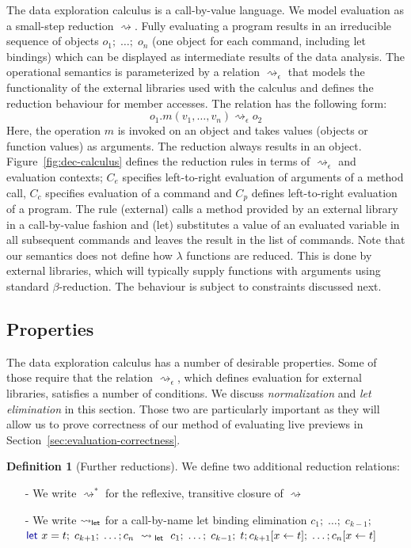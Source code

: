 \documentclass[english,submission]{programming}
\newcounter{dfc}
\theoremstyle{plain}
\theoremstyle{definition}
\newtheorem{definition}[dfc]{Definition}
\newcommand{\ident}[1]{\textnormal{\textcolor{idclr}{\sffamily #1}}}
\newcommand{\kvd}[1]{\textnormal{\textcolor{kvdclr}{\sffamily #1}}}
\newcommand{\rname}[1]{{\sffamily(#1)}}
\begin{document}
The data exploration calculus is a call-by-value language. We model evaluation as a small-step
reduction $\rightsquigarrow$. Fully evaluating a program results in an irreducible sequence of
objects $o_1;\; \ldots;\; o_n$ (one object for each command, including let bindings) which can be
displayed as intermediate results of the data analysis. The operational semantics is parameterized
by a relation $\rightsquigarrow_\epsilon$ that models the functionality of the external libraries
used with the calculus and defines the reduction behaviour for member accesses. The relation has the
following form:
%
\begin{equation*}
o_1.m(v_1, \ldots, v_n) \rightsquigarrow_\epsilon o_2
\end{equation*}
%
Here, the operation $m$ is invoked on an object and takes values (objects or function values) as arguments.
The reduction always results in an object.
Figure~\ref{fig:dec-calculus} defines the reduction rules in terms of $\rightsquigarrow_\epsilon$
and evaluation contexts; $C_e$ specifies left-to-right evaluation of arguments of a method call,
$C_c$ specifies evaluation of a command and $C_p$ defines left-to-right evaluation of a program.
The rule \rname{external} calls a method provided by an external library in a
call-by-value fashion and \rname{let} substitutes a value of an evaluated variable in
all subsequent commands and leaves the result in the list of commands.
Note that our semantics does not define how $\lambda$ functions are reduced. This is done by
external libraries, which will typically supply functions with arguments using standard $\beta$-reduction.
The behaviour is subject to constraints discussed next.

\subsection{Properties}
The data exploration calculus has a number of desirable properties. Some of those require that the
relation $\rightsquigarrow_\epsilon$, which defines evaluation for external libraries, satisfies a
number of conditions. We discuss \emph{normalization} and \emph{let elimination} in this section.
Those two are particularly important as they will allow us to prove correctness of our method of
evaluating live previews in Section~\ref{sec:evaluation-correctness}.

\begin{definition}[Further reductions]
\label{def:further-red}
We define two additional reduction relations:
\begin{itemize}
\item[-] We write $\rightsquigarrow^{*}$ for the reflexive, transitive closure of $\rightsquigarrow$
\item[-] We write $\rightsquigarrow_\ident{let}$ for a call-by-name let binding elimination
  $c_1;\; \ldots;\; c_{k-1};\;$\\ $\kvd{let}~x=t;\; c_{k+1};\; \ldots; c_n ~\rightsquigarrow_\ident{let}~
  c_1;\; \ldots;\; c_{k-1};\; t; c_{k+1}[x\leftarrow t];\; \ldots; c_n[x\leftarrow t]$
\end{itemize}
\end{definition}
\end{document}
